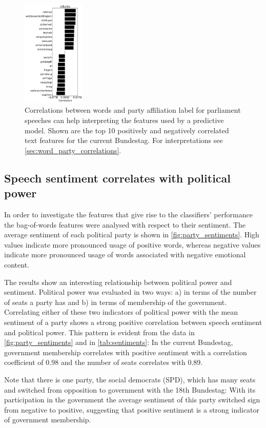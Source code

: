 \documentclass[runningheads,a4paper]{llncs}
\begin{document}
\begin{figure}
\begin{center}
\includegraphics[width=3cm]{images/party_word_correlations-cducsu-18.pdf}
%
\end{center}
\caption{
\label{fig:party_word_correlations}
Correlations between words and party affiliation label for parliament speeches can help interpreting the features used by a predictive model. Shown are the top 10 positively and negatively correlated text features for the current Bundestag. For interpretations see \autoref{sec:word_party_correlations}.}
\end{figure}


\subsection{Speech sentiment correlates with political power}\label{sec:sentiment_result}
In order to investigate the features that give rise to the classifiers' performance the bag-of-words features were analysed with respect to their sentiment. The average sentiment of each political party is shown in \autoref{fig:party_sentiments}. High values indicate more pronounced usage of positive words, whereas negative values indicate more pronounced usage of words associated with negative emotional content. 

The results show an interesting relationship between political power and sentiment. Political power was evaluated in two ways: a) in terms of the number of seats a party has and b) in terms of membership of the government. Correlating either of these two indicators of political power with the mean sentiment of a party shows a strong positive correlation between speech sentiment and political power. This pattern is evident from the data in \autoref{fig:party_sentiments} and in \autoref{tab:sentiments}: In the current Bundestag, government membership correlates with positive sentiment with a correlation coefficient of 0.98 and the number of seats correlates with 0.89. 

Note that there is one party, the social democrats (SPD), which has many seats and switched from opposition to government with the 18th Bundestag: With its participation in the government the average sentiment of this party switched sign from negative to positive, suggesting that positive sentiment is a strong indicator of government membership. 
\end{document}
